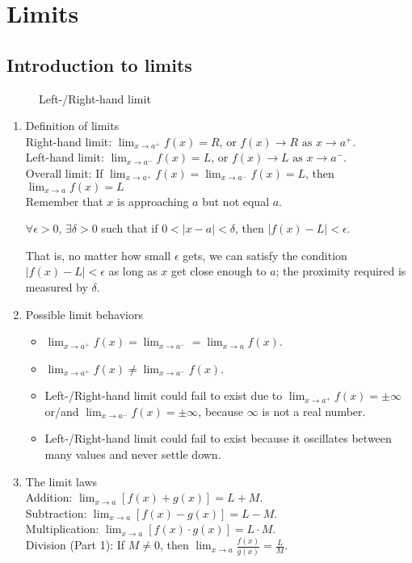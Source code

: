%
\chapter{Limits}
\section{Introduction to limits}
\begin{figure}[H]
    \centering
    \caption{Left-/Right-hand limit}
\end{figure}
\begin{enumerate}
    \item Definition of limits \\
        Right-hand limit: $\lim_{x\to a^+} f(x)=R$, or $f(x)\to R\text{ as }x\to a^+$. \\
        Left-hand limit: $\lim_{x\to a^-} f(x)=L$, or $f(x)\to L\text{ as }x\to a^-$. \\
        Overall limit: If $\lim_{x\to a^+} f(x)=\lim_{x\to a^-} f(x)=L$, then $\lim_{x\to a} f(x)=L$ \\
        Remember that $x$ is approaching $a$ but not equal $a$.
        \begin{definition}
            $\forall\epsilon>0$, $\exists\delta>0$ such that if $0<|x-a|<\delta$, then $|f(x)-L|<\epsilon$.

            That is, no matter how small $\epsilon$ gets, we can satisfy the condition $|f(x)-L|<\epsilon$ as long as $x$ get close enough to $a$; the proximity required is measured by $\delta$.
        \end{definition}
    \item Possible limit behaviors \\
        \begin{itemize}
            \item $\lim_{x\to a^+} f(x)=\lim_{x\to a^-}=\lim_{x\to a} f(x)$.
            \item $\lim_{x\to a^+} f(x)\neq\lim_{x\to a^-} f(x)$.
            \item Left-/Right-hand limit could fail to exist due to $\lim_{x\to a^+} f(x)=\pm\infty$ or/and $\lim_{x\to a^-} f(x)=\pm\infty$, because $\infty$ is not a real number.
            \item Left-/Right-hand limit could fail to exist because it oscillates between many values and never settle down.
        \end{itemize}
    \item The limit laws \\
    Addition: $\lim_{x\to a} [f(x)+g(x)]=L+M$. \\
    Subtraction: $\lim_{x\to a} [f(x)-g(x)]=L-M.$ \\
    Multiplication: $\lim_{x\to a} [f(x)\cdot g(x)]=L\cdot M$. \\
    Division (Part 1): If $M\neq0$, then $\lim_{x\to a} \frac{f(x)}{g(x)}=\frac{L}{M}$.
\end{enumerate}

